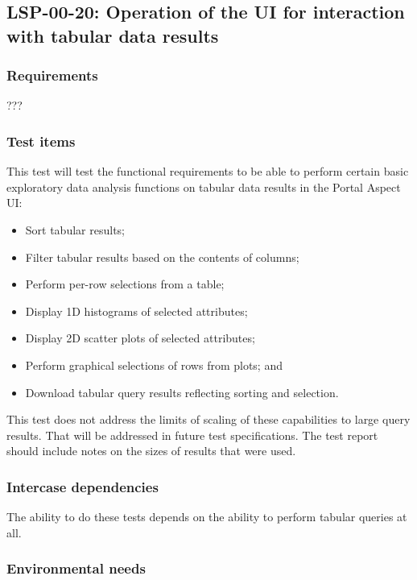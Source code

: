 \subsection{LSP-00-20: Operation of the UI for interaction with tabular data results}
\label{lsp-00-20}

\subsubsection{Requirements}

???

\subsubsection{Test items}

This test will test the functional requirements to be able to perform certain basic exploratory data analysis functions on tabular data results in the Portal Aspect UI:

\begin{itemize}

  \item{Sort tabular results;}
  \item{Filter tabular results based on the contents of columns;}
  \item{Perform per-row selections from a table;}
  \item{Display 1D histograms of selected attributes;}
  \item{Display 2D scatter plots of selected attributes;}
  \item{Perform graphical selections of rows from plots; and}
  \item{Download tabular query results reflecting sorting and selection.}

\end{itemize}

This test does not address the limits of scaling of these capabilities to large query results.
That will be addressed in future test specifications.
The test report should include notes on the sizes of results that were used.

\subsubsection{Intercase dependencies}

The ability to do these tests depends on the ability to perform tabular queries at all.

\subsubsection{Environmental needs}

